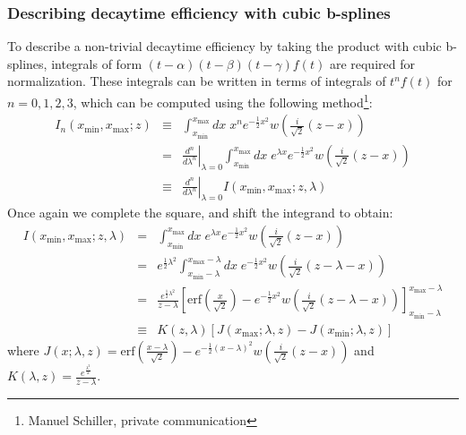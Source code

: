 \documentclass[a4paper,10pt,twosided]{article}
\begin{document}
\subsubsection{Describing decaytime efficiency with cubic b-splines}
To describe a non-trivial decaytime efficiency by taking the product with cubic b-splines, 
integrals of form $(t-\alpha)(t-\beta)(t-\gamma) f(t)$ are required for normalization.
These integrals can be written in terms of integrals of $t^nf(t)$ for $n=0,1,2,3$, which can be computed 
using the following method\footnote{Manuel Schiller, private communication}:
\begin{eqnarray*}
    I_n(x_\mathrm{min},x_\mathrm{max};z)&\equiv& \int_{x_\mathrm{min}}^{x_\mathrm{max}} dx\; x^n e^{-\frac{1}{2}x^2} w\left( \frac{i}{\sqrt{2}}(z-x)\right) 
       \\      &  =& \left.\frac{d^n}{d\lambda^n}\right|_{\lambda=0 } \int_{x_\mathrm{min}}^{x_\mathrm{max}} dx\; e^{\lambda x} e^{-\frac{1}{2}x^2} w\left( \frac{i}{\sqrt{2}}(z-x)\right) 
       \\      & \equiv& \left.\frac{d^n}{d\lambda^n}\right|_{\lambda=0 } I(x_\mathrm{min},x_\mathrm{max};z,\lambda)
\end{eqnarray*}
Once again we complete the square, and shift the integrand to obtain:
\begin{eqnarray*}
       I(x_\mathrm{min},x_\mathrm{max};z,\lambda) &=&  \int_{x_\mathrm{min}}^{x_\mathrm{max}} dx\; e^{\lambda x} e^{-\frac{1}{2}x^2} w\left( \frac{i}{\sqrt{2}}(z-x)\right) 
        \\            &=&  e^{\frac{1}{2}\lambda^2}\int_{x_\mathrm{min}-\lambda}^{x_\mathrm{max}-\lambda} dx \;  e^{-\frac{1}{2}x^2} w\left(\frac{i}{\sqrt{2}}\left(z-\lambda-x\right) \right)
        \\            &=& \frac{e^{\frac{1}{2}\lambda^2}}{z-\lambda} \left[ \mathrm{erf}\left( \frac{x}{\sqrt{2}} \right) - e^{-\frac{1}{2}x^2}w\left(\frac{i}{\sqrt{2}}\left(z-\lambda-x \right) \right) \right]_{x_\mathrm{min}-\lambda}^{x_\mathrm{max}-\lambda}
        \\            &\equiv& K(z,\lambda) \left[  J(x_\mathrm{max};\lambda,z) - J(x_\mathrm{min};\lambda,z)  \right]
\end{eqnarray*}
where $J(x;\lambda,z)=\mathrm{erf}\left(\frac{x-\lambda}{\sqrt{2}}\right)-e^{-\frac{1}{2}\left(x-\lambda\right)^2}w\left(\frac{i}{\sqrt{2}}\left(z-x\right) \right)$ and $K(\lambda,z)=\frac{e^{\frac{\lambda^2}{2}}}{z-\lambda}$.
\end{document}
